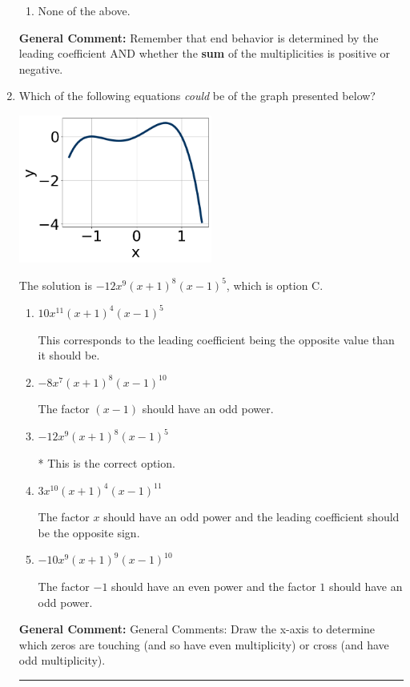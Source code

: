 \documentclass{extbook}[14pt]
\newcommand{\litem}[1]{\item #1

\rule{\textwidth}{0.4pt}}
\begin{document}
\begin{enumerate}
{\begin{enumerate}[label=\Alph*.]
\begin{multicols}{2}
\end{multicols}\item None of the above.\end{enumerate}
\textbf{General Comment:} Remember that end behavior is determined by the leading coefficient AND whether the \textbf{sum} of the multiplicities is positive or negative.
}
\litem{
Which of the following equations \textit{could} be of the graph presented below?

\begin{center}
    \includegraphics[width=0.5\textwidth]{../Figures/polyGraphToFunctionA.png}
\end{center}


The solution is \( -12x^{9} (x + 1)^{8} (x - 1)^{5} \), which is option C.\begin{enumerate}[label=\Alph*.]
\item \( 10x^{11} (x + 1)^{4} (x - 1)^{5} \)

This corresponds to the leading coefficient being the opposite value than it should be.
\item \( -8x^{7} (x + 1)^{8} (x - 1)^{10} \)

The factor $(x - 1)$ should have an odd power.
\item \( -12x^{9} (x + 1)^{8} (x - 1)^{5} \)

* This is the correct option.
\item \( 3x^{10} (x + 1)^{4} (x - 1)^{11} \)

The factor $x$ should have an odd power and the leading coefficient should be the opposite sign.
\item \( -10x^{9} (x + 1)^{9} (x - 1)^{10} \)

The factor $-1$ should have an even power and the factor $1$ should have an odd power.
\end{enumerate}

\textbf{General Comment:} General Comments: Draw the x-axis to determine which zeros are touching (and so have even multiplicity) or cross (and have odd multiplicity).
}
\end{enumerate}
\end{document}
